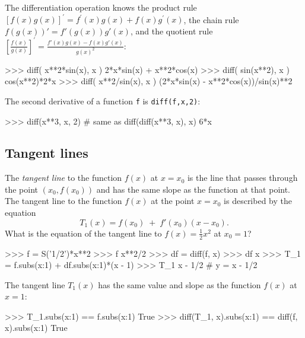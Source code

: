 \noindent
The differentiation operation knows the product rule $[f(x)g(x)]^\prime=f^\prime(x)g(x)+f(x)g^\prime(x)$, 
the chain rule $f(g(x))' = f'(g(x))g'(x)$, 
and the quotient rule $\left[\frac{f(x)}{g(x)}\right]^\prime = \frac{f'(x)g(x) - f(x)g'(x)}{g(x)^2}$:



\small
\begin{verbatimtab}
>>> diff( x**2*sin(x), x )
2*x*sin(x) + x**2*cos(x)
>>> diff( sin(x**2), x )
cos(x**2)*2*x
>>> diff( x**2/sin(x), x )
(2*x*sin(x) - x**2*cos(x))/sin(x)**2
\end{verbatimtab}
\normalsize

\noindent
The second derivative of a function \texttt{f} is \texttt{diff(f,x,2)}:



\small
\begin{verbatimtab}
>>> diff(x**3, x, 2)       # same as diff(diff(x**3, x), x)
6*x
\end{verbatimtab}
\normalsize



\subsection{Tangent lines}
\label{calculus:tangent_lines}

The \emph{tangent line} to the function $f(x)$ at $x=x_0$ is 													
the line that passes through the point $(x_0, f(x_0))$ and has 
the same slope as the function at that point.
The tangent line to the function $f(x)$ at the point $x=x_0$ is described by the equation
\[
   T_1(x) =  f(x_0) \; + \;  f'(x_0)(x-x_0).
\]
What is the equation of the tangent line to $f(x)=\frac{1}{2}x^2$ at $x_0=1$?



\small
\begin{verbatimtab}
>>> f = S('1/2')*x**2
>>> f
x**2/2
>>> df = diff(f, x)
>>> df
x
>>> T_1 = f.subs({x:1}) + df.subs({x:1})*(x - 1)
>>> T_1
x - 1/2           #  y = x - 1/2
\end{verbatimtab}
\normalsize

\noindent
The tangent line $T_1(x)$ has the same value and slope as the function $f(x)$ at $x=1$:
\small
\begin{verbatimtab}
>>> T_1.subs({x:1}) == f.subs({x:1})
True
>>> diff(T_1, x).subs({x:1}) == diff(f, x).subs({x:1})
True
\end{verbatimtab}
\normalsize

